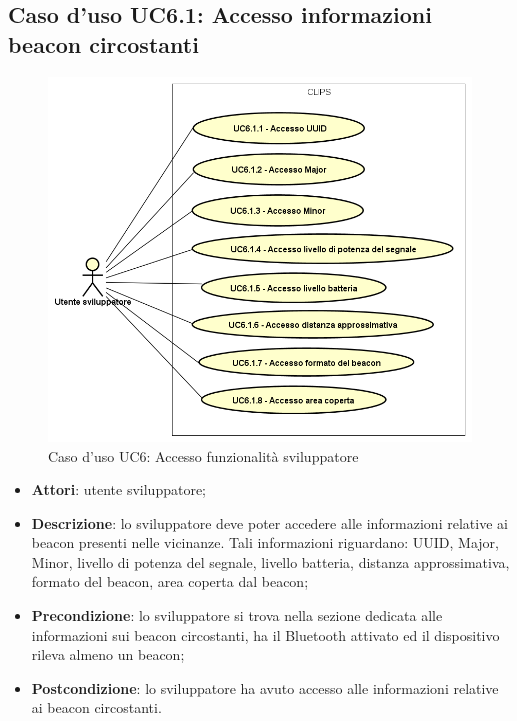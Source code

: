\documentclass[../AnalisiDeiRequisiti.tex]{subfiles}
\begin{document}
\subsection{Caso d'uso UC6.1: Accesso informazioni beacon circostanti}
\begin{figure}[!h]
            \centering
            \includegraphics[scale=0.95, width=\textwidth]{img/UC6-1.png}
            \caption{Caso d'uso UC6: Accesso funzionalità sviluppatore}\label{fig:UC6} 
        \end{figure}
\begin{itemize}
\item \textbf{Attori}: utente sviluppatore;
\item \textbf{Descrizione}: lo sviluppatore deve poter accedere alle informazioni relative ai beacon presenti nelle vicinanze. Tali informazioni riguardano: UUID, Major, Minor, livello di potenza del segnale, livello batteria, distanza approssimativa, formato del beacon, area coperta dal beacon; 
      \item \textbf{Precondizione}: lo sviluppatore si trova nella sezione dedicata alle informazioni sui beacon circostanti, ha il Bluetooth attivato ed il dispositivo rileva almeno un beacon;
    \item \textbf{Postcondizione}: lo sviluppatore ha avuto accesso alle informazioni relative ai beacon circostanti.
  \end{itemize}
\hypertarget{UC6.1.1}{}
\end{document}
